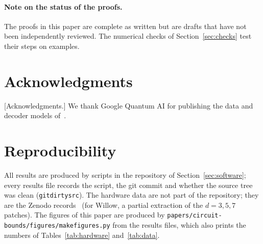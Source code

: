 \documentclass[11pt]{article}
\theoremstyle{plain}
\theoremstyle{definition}
\theoremstyle{remark}
\newcommand{\tsc}[1]{\texttt{#1}}
\renewcommand{\_}{\oldunderscore\allowbreak}
\newcommand{\sla}{/\allowbreak}
\begin{document}
\paragraph{Note on the status of the proofs.} The proofs in this paper are complete as written but are drafts that have not been independently reviewed. The numerical checks of Section~\ref{sec:checks} test their steps on examples.

\section*{Acknowledgments}
[Acknowledgments.] We thank Google Quantum AI for publishing the data and decoder models of~\cite{Google22,Google24}.

\appendix

\section{Reproducibility}\label{app:repro}

All results are produced by scripts in the repository of Section~\ref{sec:software}; every results file records the script, the git commit and whether the source tree was clean (\tsc{git\_dirty\_src}). The hardware data are not part of the repository; they are the Zenodo records~\cite{ZenodoSycamore,ZenodoWillow} (for Willow, a partial extraction of the $d=3,5,7$ patches). The figures of this paper are produced by \tsc{papers\sla circuit-bounds\sla figures\sla make\_figures.py} from the results files, which also prints the numbers of Tables~\ref{tab:hardware} and~\ref{tab:data}.
\end{document}

